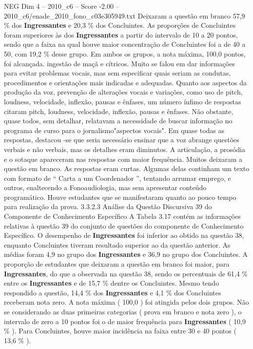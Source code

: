 \begin{textsample}{NEG Dim 4 – 2010\_c6 – Score -2.00 – 2010\_c6/enade\_2010\_fono\_c03e305949.txt}
Deixaram a questão em branco 57,9 \% dos \textbf{Ingressantes} e 20,3 \% dos Concluintes.
As proporções de Concluintes foram superiores às dos \textbf{Ingressantes} a partir do intervalo de 10 a 20 pontos, sendo que a faixa na qual houve maior concentração de Concluintes foi a de 40 a 50, com 19,2 \% desse grupo.
Em ambos os grupos, a nota máxima, 100,0 pontos, foi alcançada. ingestão de maçã e cítricos.
Muito se falou em dar informações para evitar problemas vocais, mas sem especificar quais seriam as condutas, procedimentos e orientações mais indicadas e adequadas.
Quanto aos aspectos da produção da voz, prevenção de alterações vocais e variações, como uso de pitch, loudness, velocidade, inflexão, pausas e ênfases, um número ínfimo de respostas citaram pitch, loudness, velocidade, inflexão, pausas e ênfases.
Não obstante, quase todos, sem detalhar, relatavam a necessidade de buscar informação no programa de curso para o jornalismo"aspectos vocais".
Em quase todas as respostas, destacou -se que seria necessário ensinar que a voz abrange questões verbais e não verbais, mas os detalhes eram diminutos.
A articulação, a prosódia e o sotaque apareceram nas respostas com maior frequência.
Muitos deixaram a questão em branco.
As respostas eram curtas.
Algumas delas continham um texto com formato de “ Carta a um Coordenador ”, tentando arrumar emprego, e outros, enaltecendo a Fonoaudiologia, mas sem apresentar conteúdo programático.
Houve estudantes que se manifestaram quanto ao pouco tempo para realização da prova. 3.3.2.3 Análise da Questão Discursiva 39 do Componente de Conhecimento Específico A Tabela 3.17 contém as informações relativas à questão 39 do conjunto de questões do componente de Conhecimento Específico.
O desempenho de \textbf{Ingressantes} foi inferior ao obtido na questão 38, enquanto Concluintes tiveram resultado superior ao da questão anterior.
As médias foram 4,9 no grupo dos \textbf{Ingressantes} e 36,9 no grupo dos Concluintes.
A proporção de estudantes que deixaram a questão em branco foi maior, para \textbf{Ingressantes}, do que a observada na questão 38, sendo os percentuais de 61,4 \% entre os \textbf{Ingressantes} e de 15,7 \% dentre os Concluintes.
Mesmo tendo respondido a questão, 14,4 \% dos \textbf{Ingressantes} e 4,1 \% dos Concluintes receberam nota zero.
A nota máxima ( 100,0 ) foi atingida pelos dois grupos.
Não se considerando as duas primeiras categorias ( prova em branco e nota zero ), o intervalo de zero a 10 pontos foi o de maior frequência para \textbf{Ingressantes} ( 10,9 \% ).
Para Concluintes, houve maior incidência na faixa entre 30 e 40 pontos ( 13,6 \% ).

\end{textsample}
